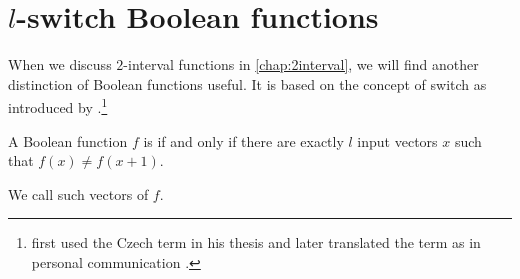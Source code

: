 \section{\texorpdfstring{$l$}{l}-switch Boolean functions}

When we discuss $2$-interval functions
in \autoref{chap:2interval},
we will find another distinction
of Boolean functions useful.
It is based on the concept of switch
as introduced by \citet{Husek2014,Husek2015}.\footnote{
\citeauthor{Husek2014} first used the Czech term
in his thesis \citep[p.~13]{Husek2014}
and later translated the term as 
in personal communication \citep{Husek2015}.
}

\begin{definition}
A Boolean function $f$ is 
if and only if
there are exactly $l$ input vectors $x$ such that
$f(x) \neq f(x+1)$.

We call such vectors  of $f$.
\end{definition}
